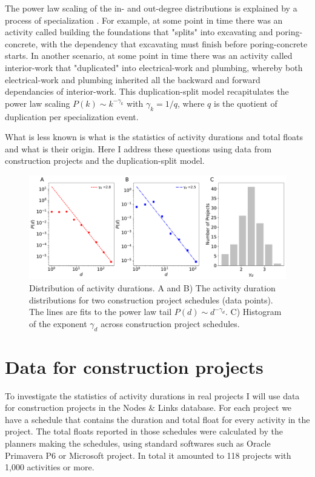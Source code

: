 \documentclass[11pt]{article}
\begin{document}
The power law scaling of the in- and out-degree distributions is explained by a process of specialization \cite{vazquez23}. For example, at some point in time there was an activity called building the foundations that "splits" into excavating and  poring-concrete, with the dependency that excavating must finish before poring-concrete starts. In another scenario, at some point in time there was an activity called interior-work that "duplicated" into electrical-work and plumbing, whereby both electrical-work and plumbing inherited all the backward and forward dependancies of interior-work. This duplication-split model recapitulates the power law scaling $P(k)\sim k^{-\gamma_k}$ with $\gamma_k=1/q$, where $q$ is the quotient of duplication per specialization event.

What is less known is what is the statistics of activity durations and total floats and what is their origin. Here I address these questions using data from construction projects and the duplication-split model. 

\begin{figure}[t]
\includegraphics[width=6.3in]{fig_data_d}
\caption{Distribution of activity durations. A and B) The activity duration distributions for two construction project schedules (data points). The lines are fits to the power law tail $P(d)\sim d^{-\gamma_d}$. C) Histogram of the exponent $\gamma_d$ across construction project schedules.}
\label{fig_data_d}
\end{figure}

\section{Data for construction projects}

To investigate the statistics of activity durations in real projects I will use data for construction projects in the Nodes \& Links database. For each project we have a schedule that contains the duration and total float for every activity in the project. The total floats reported in those schedules were calculated by the planners making the schedules, using standard softwares such as Oracle Primavera P6 or Microsoft project. In total it amounted to 118 projects with 1,000 activities or more.
\end{document}
